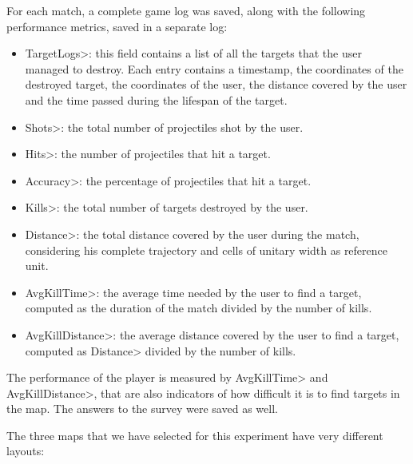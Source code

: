 For each match, a complete game log was saved, along with the following performance metrics, saved in a separate log:
\begin{itemize}
\item \<TargetLogs>: this field contains a list of all the targets that the user managed to destroy. Each entry contains a timestamp, the coordinates of the destroyed target, the coordinates of the user, the distance covered by the user and the time passed during the lifespan of the target.
\item \<Shots>: the total number of projectiles shot by the user.
\item \<Hits>: the number of projectiles that hit a target.
\item \<Accuracy>: the percentage of projectiles that hit a target.
\item \<Kills>: the total number of targets destroyed by the user.
\item \<Distance>: the total distance covered by the user during the match, considering his complete trajectory and cells of unitary width as reference unit.
\item \<AvgKillTime>: the average time needed by the user to find a target, computed as the duration of the match divided by the number of kills.
\item \<AvgKillDistance>: the average distance covered by the user to find a target, computed as \<Distance> divided by the number of kills.
\end{itemize}

\noindent
The performance of the player is measured by \<AvgKillTime> and \<AvgKillDistance>, that are also indicators of how difficult it is to find targets in the map. The answers to the survey were saved as well.

\par

The three maps that we have selected for this experiment have very different layouts:

